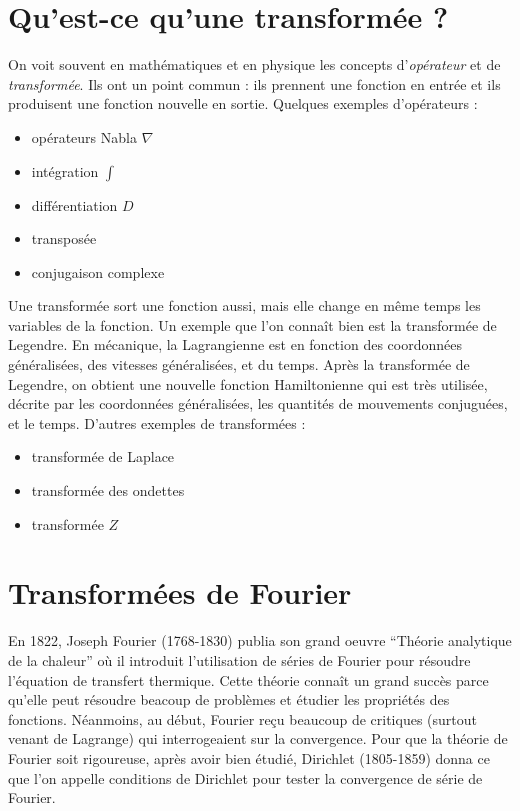 \documentclass{report}
\begin{document}
	\section{Qu'est-ce qu'une transformée ?}
	On voit souvent en mathématiques et en physique les concepts d'\emph{opérateur} et de \emph{transformée}. Ils ont un point commun : ils prennent une fonction en entrée et ils produisent une fonction nouvelle en sortie. Quelques exemples d'opérateurs :
	\begin{itemize}
		\item opérateurs Nabla $\nabla$
		\item intégration $\int$
		\item différentiation $D$
		\item transposée
		\item conjugaison complexe
	\end{itemize}
	Une transformée sort une fonction aussi, mais elle change en même temps les variables de la fonction. Un exemple que l'on connaît bien est la transformée de Legendre. En mécanique, la Lagrangienne est en fonction des coordonnées généralisées, des vitesses généralisées, et du temps. Après la transformée de Legendre, on obtient une nouvelle fonction Hamiltonienne qui est très utilisée, décrite par les coordonnées généralisées, les quantités de mouvements conjuguées, et le temps. D'autres exemples de transformées :
	\begin{itemize}
		\item transformée de Laplace
		\item transformée des ondettes
		\item transformée $Z$
	\end{itemize}

	\section{Transformées de Fourier}
		En 1822, Joseph Fourier (1768-1830) publia son grand oeuvre ``Théorie analytique de la chaleur'' où il introduit l'utilisation de séries de Fourier pour résoudre l'équation de transfert thermique. Cette théorie connaît un grand succès parce qu'elle peut résoudre beacoup de problèmes et étudier les propriétés des fonctions. Néanmoins, au début, Fourier reçu beaucoup de critiques (surtout venant de Lagrange) qui interrogeaient sur la convergence. Pour que la théorie de Fourier soit rigoureuse, après avoir bien étudié, Dirichlet (1805-1859) donna ce que l'on appelle conditions de Dirichlet pour tester la convergence de série de Fourier.
\end{document}
